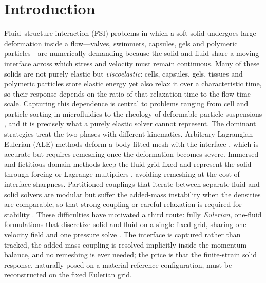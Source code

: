 \documentclass[final,3p,times]{elsarticle}
\theoremstyle{remark}
\begin{document}
\section{Introduction}
\label{sec:intro}

Fluid--structure interaction (FSI) problems in which a soft solid undergoes large
deformation inside a flow---valves, swimmers, capsules, gels and polymeric
particles---are numerically demanding because the solid and fluid share a moving
interface across which stress and velocity must remain continuous. Many of these solids are not
purely elastic but \emph{viscoelastic}: cells, capsules, gels, tissues and polymeric particles
store elastic energy yet also relax it over a characteristic time, so their response depends on
the ratio of that relaxation time to the flow time scale. Capturing this dependence is central
to problems ranging from cell and particle sorting in microfluidics to the rheology of
deformable-particle suspensions \cite{Sugiyama2011,Rosti2018prf}, and it is precisely what a
purely elastic solver cannot represent. The dominant
strategies treat the two phases with different kinematics. Arbitrary
Lagrangian--Eulerian (ALE) methods deform a body-fitted mesh with the interface
\cite{Donea1982,Hu2001},  which is accurate but requires remeshing once the
deformation becomes severe. Immersed and fictitious-domain methods keep the fluid
grid fixed and represent the solid through forcing or Lagrange multipliers
\cite{Peskin2002,Zhang2004}, avoiding remeshing at the cost of interface sharpness.
Partitioned couplings that iterate between separate fluid and solid solvers are
modular but suffer the added-mass instability when the densities are comparable, so
that strong coupling or careful relaxation is required for stability
\cite{Causin2005,Hou2012}. These difficulties have motivated a third route: fully
\emph{Eulerian}, one-fluid formulations that discretize solid and fluid on a single
fixed grid, sharing one velocity field and one pressure solve
\cite{Sugiyama2011,Ii2012,Cottet2008,Wick2013}. The interface is captured rather than
tracked, the added-mass coupling is resolved implicitly inside the momentum
balance, and no remeshing is ever needed; the price is that the finite-strain solid
response, naturally posed on a material reference configuration, must be reconstructed on the
fixed Eulerian grid.
\end{document}
